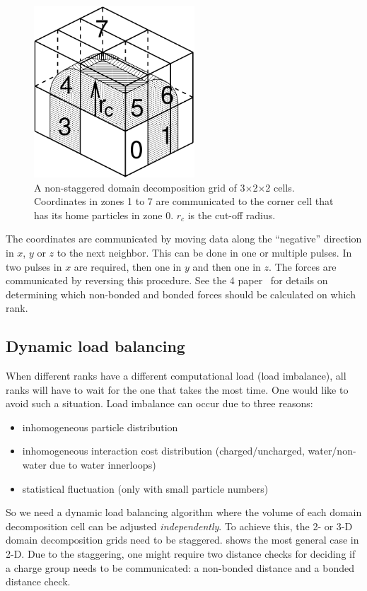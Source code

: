 \begin{figure}
\centerline{\includegraphics[width=6cm]{plots/dd-cells}}
\caption{
A non-staggered domain decomposition grid of 3$\times$2$\times$2 cells.
Coordinates in zones 1 to 7 are communicated to the corner cell
that has its home particles in zone 0.
$r_c$ is the cut-off radius. 
\label{fig:ddcells}
}
\end{figure}

The coordinates are communicated by moving data along the ``negative''
direction in $x$, $y$ or $z$ to the next neighbor. This can be done in one
or multiple pulses. In  two pulses in $x$ are required,
then one in $y$ and then one in $z$. The forces are communicated by
reversing this procedure. See the {\gromacs} 4 paper~\cite{Hess2008b}
for details on determining which non-bonded and bonded forces
should be calculated on which rank.

\subsection{Dynamic load balancing}
When different ranks have a different computational load
(load imbalance), all ranks will have to wait for the one
that takes the most time. One would like to avoid such a situation.
Load imbalance can occur due to three reasons:
\begin{itemize}
\item inhomogeneous particle distribution
\item inhomogeneous interaction cost distribution (charged/uncharged,
  water/non-water due to {\gromacs} water innerloops)
\item statistical fluctuation (only with small particle numbers)
\end{itemize}
So we need a dynamic load balancing algorithm
where the volume of each domain decomposition cell
can be adjusted {\em independently}.
To achieve this, the 2- or 3-D domain decomposition grids need to be
staggered.  shows the most general case in 2-D.
Due to the staggering, one might require two distance checks
for deciding if a charge group needs to be communicated:
a non-bonded distance and a bonded distance check.

